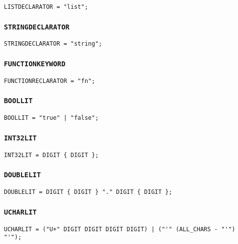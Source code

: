 \documentclass[12pt, a4paper]{article}
\begin{document}
\begin{verbatim}
LISTDECLARATOR = "list";
\end{verbatim}

\subsubsection{\texttt{STRINGDECLARATOR}}

\begin{verbatim}
STRINGDECLARATOR = "string";
\end{verbatim}

\subsubsection{\texttt{FUNCTIONKEYWORD}}

\begin{verbatim}
FUNCTIONRECLARATOR = "fn";
\end{verbatim}

\subsubsection{\texttt{BOOLLIT}}

\begin{verbatim}
BOOLLIT = "true" | "false";
\end{verbatim}

\subsubsection{\texttt{INT32LIT}}

\begin{verbatim}
INT32LIT = DIGIT { DIGIT };
\end{verbatim}

\subsubsection{\texttt{DOUBLELIT}}

\begin{verbatim}
DOUBLELIT = DIGIT { DIGIT } "." DIGIT { DIGIT };
\end{verbatim}

\subsubsection{\texttt{UCHARLIT}}

\begin{verbatim}
UCHARLIT = ("U+" DIGIT DIGIT DIGIT DIGIT) | ("'" (ALL_CHARS - "'") "'");
\end{verbatim}
\end{document}
